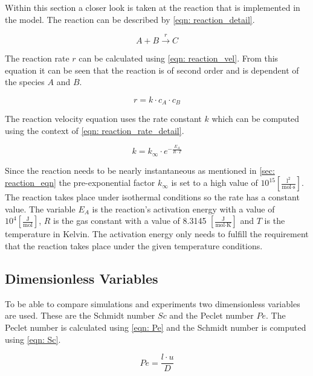\documentclass[../thesis.tex]{subfiles}
\begin{document}
Within this section a closer look is taken at the reaction that is implemented in the model. The reaction can be described by \autoref{eqn: reaction_detail}.

\begin{equation}
	\label{eqn: reaction_detail}
	A + B \xrightarrow{r} C
\end{equation}

The reaction rate $r$ can be calculated using \autoref{eqn: reaction_vel}. From this equation it can be seen that the reaction is of second order and is dependent of the species $A$ and $B$.

\begin{equation}
	\label{eqn: reaction_vel}
	r = k \cdot c_A \cdot c_B
\end{equation}

The reaction velocity equation uses the rate constant $k$ which can be computed using the context of \autoref{eqn: reaction_rate_detail}.

\begin{equation}
	\label{eqn: reaction_rate_detail}
	k = k_{\infty} \cdot e^{- \frac{E_A}{R \cdot T}}
\end{equation}

Since the reaction needs to be nearly instantaneous as mentioned in \autoref{sec: reaction_eqn} the pre-exponential factor $k_{\infty}$ is set to a high value of $10^{15} \left[ \frac{\text{l}^2}{\text{mol} \cdot \text{s}} \right] $. The reaction takes place under isothermal conditions so the rate has a constant value. The variable $E_A$ is the reaction's activation energy with a value of $10^4 \left[ \frac{\text{J}}{\text{mol}} \right] $, $R$ is the gas constant with a value of 8.3145 $\left[ \frac{\text{J}}{\text{mol} \cdot \text{K}} \right] $ and $T$ is the temperature in Kelvin. The activation energy only needs to fulfill the requirement that the reaction takes place under the given temperature conditions.

\subsection{Dimensionless Variables}

To be able to compare simulations and experiments two dimensionless variables are used. These are the Schmidt number $Sc$ and the Peclet number $Pe$. The Peclet number is calculated using \autoref{eqn: Pe} and the Schmidt number is computed using \autoref{eqn: Sc}.

\begin{equation}
	\label{eqn: Pe}
	Pe = \dfrac{l \cdot u}{D}
\end{equation}
\end{document}
